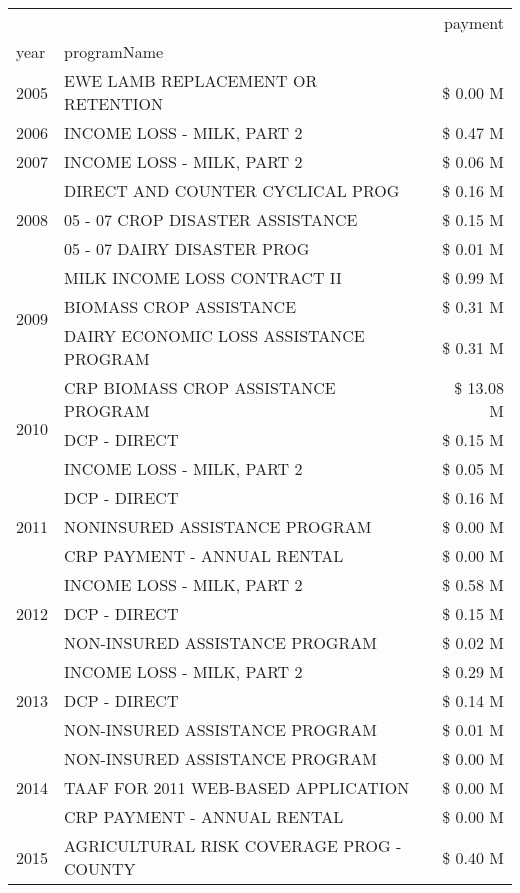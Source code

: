 \begin{tabular}{llr}
\toprule
 &  & payment \\
year & programName &  \\
\midrule
2005 & EWE LAMB REPLACEMENT OR RETENTION & \$ 0.00 M \\
\cline{1-3}
2006 & INCOME LOSS - MILK, PART 2 & \$ 0.47 M \\
\cline{1-3}
2007 & INCOME LOSS - MILK, PART 2 & \$ 0.06 M \\
\cline{1-3}
\multirow[t]{3}{*}{2008} & DIRECT AND COUNTER CYCLICAL PROG & \$ 0.16 M \\
 & 05 - 07 CROP DISASTER ASSISTANCE & \$ 0.15 M \\
 & 05 - 07 DAIRY DISASTER PROG & \$ 0.01 M \\
\cline{1-3}
\multirow[t]{3}{*}{2009} & MILK INCOME LOSS CONTRACT II & \$ 0.99 M \\
 & BIOMASS CROP ASSISTANCE & \$ 0.31 M \\
 & DAIRY ECONOMIC LOSS ASSISTANCE PROGRAM & \$ 0.31 M \\
\cline{1-3}
\multirow[t]{3}{*}{2010} & CRP BIOMASS CROP ASSISTANCE PROGRAM & \$ 13.08 M \\
 & DCP - DIRECT & \$ 0.15 M \\
 & INCOME LOSS - MILK, PART 2 & \$ 0.05 M \\
\cline{1-3}
\multirow[t]{3}{*}{2011} & DCP - DIRECT & \$ 0.16 M \\
 & NONINSURED ASSISTANCE PROGRAM & \$ 0.00 M \\
 & CRP PAYMENT - ANNUAL RENTAL & \$ 0.00 M \\
\cline{1-3}
\multirow[t]{3}{*}{2012} & INCOME LOSS - MILK, PART 2 & \$ 0.58 M \\
 & DCP - DIRECT & \$ 0.15 M \\
 & NON-INSURED ASSISTANCE PROGRAM & \$ 0.02 M \\
\cline{1-3}
\multirow[t]{3}{*}{2013} & INCOME LOSS - MILK, PART 2 & \$ 0.29 M \\
 & DCP - DIRECT & \$ 0.14 M \\
 & NON-INSURED ASSISTANCE PROGRAM & \$ 0.01 M \\
\cline{1-3}
\multirow[t]{3}{*}{2014} & NON-INSURED ASSISTANCE PROGRAM & \$ 0.00 M \\
 & TAAF FOR 2011 WEB-BASED APPLICATION & \$ 0.00 M \\
 & CRP PAYMENT - ANNUAL RENTAL & \$ 0.00 M \\
\cline{1-3}
\multirow[t]{3}{*}{2015} & AGRICULTURAL RISK COVERAGE PROG - COUNTY & \$ 0.40 M \\

\end{tabular}
